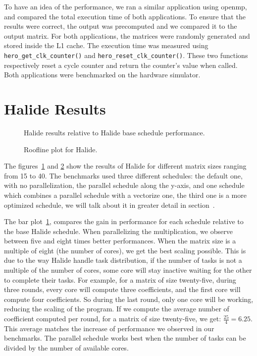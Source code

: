     To have an idea of the performance, we ran a similar application using \gls{openmp}, and compared the total execution time of both applications.
    To ensure that the results were correct, the output was precomputed and we compared it to the output matrix.
    For both applications, the matrices were randomly generated and stored inside the L1 cache.
    The execution time was measured using \texttt{hero\_get\_clk\_counter()} and \texttt{hero\_reset\_clk\_counter()}.
    These two functions respectively reset a cycle counter and return the counter's value when called. 
    Both applications were benchmarked on the hardware simulator.
\section{Halide Results}

\begin{figure}[H]
        \center
        \scalebox{.8}{}
    \caption{Halide results relative to Halide base schedule performance.}
    \label{fig:barPlotHalide}
\end{figure}



\begin{figure}[H]
        \center
    \scalebox{.8}{}
    \caption{Roofline plot for Halide.}
    \label{fig:rooflineHalide}
\end{figure}



    The figures~\ref{fig:barPlotHalide} and \ref{fig:rooflineHalide} show the results of Halide for different matrix sizes ranging from 15 to 40.
    The benchmarks used three different schedules: the default one, with no parallelization, the parallel schedule along the y-axis, and one schedule which combines a parallel schedule with a vectorize one, the third one is a more optimized schedule, we will talk about it in greater detail in section~.

    The bar plot~\ref{fig:barPlotHalide}, compares the gain in performance for each schedule relative to the base Halide schedule. When parallelizing the multiplication, we observe between five and eight times better performances. When the matrix size is a multiple of eight (the number of cores), we get the best scaling possible.
    This is due to the way Halide handle task distribution, if the number of tasks is not a multiple of the number of cores, some core will stay inactive waiting for the other to complete their tasks.
    For example, for a matrix of size twenty-five, during three rounds, every core will compute three coefficients, and the first core will compute four coefficients.
    So during the last round, only one core will be working, reducing the scaling of the program.
    If we compute the average number of coefficient computed per round, for a matrix of size twenty-five, we get: $\frac{25}{4}=6.25$.
     This average matches the increase of performance we observed in our benchmarks.
     The parallel schedule works best when the number of tasks can be divided by the number of available cores.


